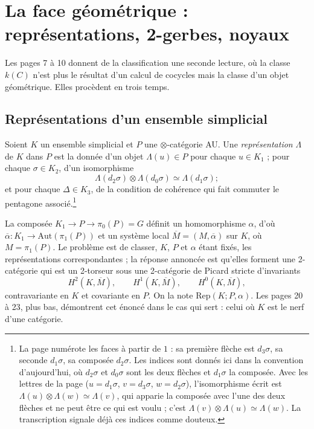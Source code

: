 \documentclass[11pt,a4paper]{article}
\begin{document}
\section*{La face géométrique : représentations, 2-gerbes, noyaux}

Les pages 7 à 10 donnent de la classification une seconde lecture, où la
classe $k(C)$ n'est plus le résultat d'un calcul de cocycles mais la classe
d'un objet géométrique. Elles procèdent en trois temps.

\subsection*{Représentations d'un ensemble simplicial}

Soient $K$ un ensemble simplicial et $P$ une $\otimes$-catégorie AU. Une
\emph{représentation} $\Lambda$ de $K$ dans $P$ est la donnée d'un objet
$\Lambda(u) \in P$ pour chaque $u \in K_{1}$ ; pour chaque $\sigma \in K_{2}$,
d'un isomorphisme
\[
\Lambda(d_{2}\sigma) \otimes \Lambda(d_{0}\sigma) \simeq
\Lambda(d_{1}\sigma) ;
\]
et pour chaque $\Delta \in K_{3}$, de la condition de cohérence qui fait
commuter le pentagone associé.\footnote{La page numérote les faces à partir
de $1$ : sa première flèche est $d_{3}\sigma$, sa seconde $d_{1}\sigma$, sa
composée $d_{2}\sigma$. Les indices sont donnés ici dans la convention
d'aujourd'hui, où $d_{2}\sigma$ et $d_{0}\sigma$ sont les deux flèches et
$d_{1}\sigma$ la composée. Avec les lettres de la page ($u = d_{1}\sigma$,
$v = d_{3}\sigma$, $w = d_{2}\sigma$), l'isomorphisme écrit est
$\Lambda(u) \otimes \Lambda(w) \simeq \Lambda(v)$, qui apparie la composée
avec l'une des deux flèches et ne peut être ce qui est voulu ; c'est
$\Lambda(v) \otimes \Lambda(u) \simeq \Lambda(w)$. La transcription signale
déjà ces indices comme douteux.}

La composée $K_{1} \to P \to \pi_{0}(P) = G$ définit un homomorphisme
$\alpha$, d'où $\overline{\alpha} : K_{1} \to \mathrm{Aut}(\pi_{1}(P))$ et un
système local $\overline{M} = (M, \overline{\alpha})$ sur $K$, où $M =
\pi_{1}(P)$. Le problème est de classer, $K$, $P$ et $\alpha$ étant fixés, les
représentations correspondantes ; la réponse annoncée est qu'elles forment une
2-catégorie qui est un 2-torseur sous une 2-catégorie de Picard stricte
d'invariants
\[
H^{2}(K, \overline{M}), \qquad H^{1}(K, \overline{M}), \qquad
H^{0}(K, \overline{M}),
\]
contravariante en $K$ et covariante en $P$. On la note $\mathrm{Rep}(K; P,
\alpha)$. Les pages 20 à 23, plus bas, démontrent cet énoncé dans le cas qui
sert : celui où $K$ est le nerf d'une catégorie.
\end{document}
